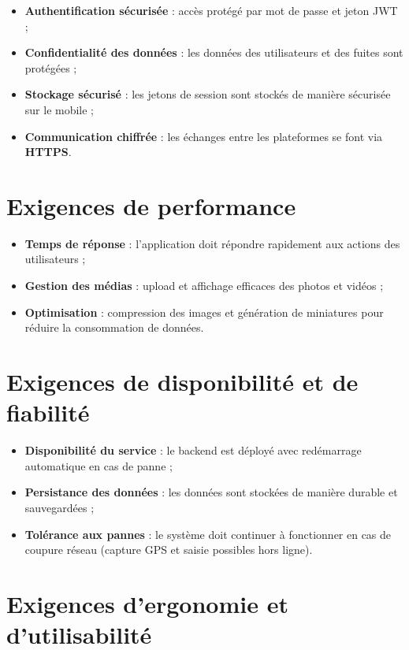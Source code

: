 \documentclass[12pt,a4paper,oneside]{report}
\begin{document}
\begin{itemize}
    \item \textbf{Authentification sécurisée} : accès protégé par mot de passe et jeton JWT ;
    \item \textbf{Confidentialité des données} : les données des utilisateurs et des fuites sont protégées ;
    \item \textbf{Stockage sécurisé} : les jetons de session sont stockés de manière sécurisée sur le mobile ;
    \item \textbf{Communication chiffrée} : les échanges entre les plateformes se font via \textbf{HTTPS}.
\end{itemize}

\section{Exigences de performance}

\begin{itemize}
    \item \textbf{Temps de réponse} : l'application doit répondre rapidement aux actions des utilisateurs ;
    \item \textbf{Gestion des médias} : upload et affichage efficaces des photos et vidéos ;
    \item \textbf{Optimisation} : compression des images et génération de miniatures pour réduire la consommation de données.
\end{itemize}

\section{Exigences de disponibilité et de fiabilité}

\begin{itemize}
    \item \textbf{Disponibilité du service} : le backend est déployé avec redémarrage automatique en cas de panne ;
    \item \textbf{Persistance des données} : les données sont stockées de manière durable et sauvegardées ;
    \item \textbf{Tolérance aux pannes} : le système doit continuer à fonctionner en cas de coupure réseau (capture GPS et saisie possibles hors ligne).
\end{itemize}

\section{Exigences d'ergonomie et d'utilisabilité}
\end{document}
